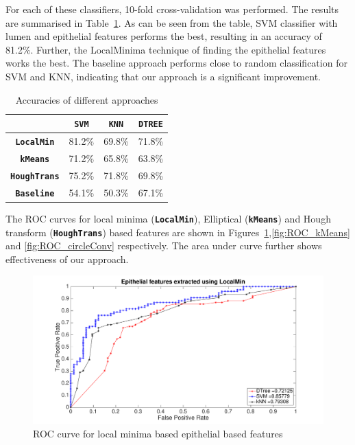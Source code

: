 For each of these classifiers, 10-fold cross-validation was performed. The results are summarised in Table~\ref{table:accuracy}. As can be seen from the table, SVM classifier with lumen and epithelial features performs the best, resulting in an accuracy of 81.2\%. Further, the LocalMinima technique of finding the epithelial features works the best. The baseline approach performs close to random classification for SVM and KNN, indicating that our approach is a significant improvement.

\begin{table}
\centering
\begin{tabular}{|c|c|c|c| }
\hline
 & \textbf{\texttt{SVM}} & \textbf{\texttt{KNN}} & \textbf{\texttt{DTREE}} \\ \hline
\textbf{\texttt{LocalMin}} & 81.2\% & 69.8\% & 71.8\% \\ \hline
\textbf{\texttt{kMeans}} & 71.2\%  & 65.8\% & 63.8\% \\ \hline
\textbf{ \texttt{HoughTrans}} & 75.2\% & 71.8\% & 69.8\% \\ \hline
\textbf{ \texttt{Baseline}} & 54.1\% & 50.3\% & 67.1\% \\ \hline
\end{tabular}
\caption{\label{table:accuracy}Accuracies of different approaches}
\end{table}

The ROC curves for local minima (\textbf{\texttt{LocalMin}}), Elliptical (\textbf{\texttt{kMeans}}) and Hough transform (\textbf{\texttt{HoughTrans}}) based features are shown in Figures~\ref{fig:ROC_localMin},\ref{fig:ROC_kMeans} and \ref{fig:ROC_circleConv} respectively. The area under curve further shows effectiveness of our approach. 

\begin{figure}
\includegraphics[scale=0.2]{figs/ROC_localMin.pdf}
\caption{\label{fig:ROC_localMin}ROC curve for local minima based epithelial based features}
\end{figure}  

